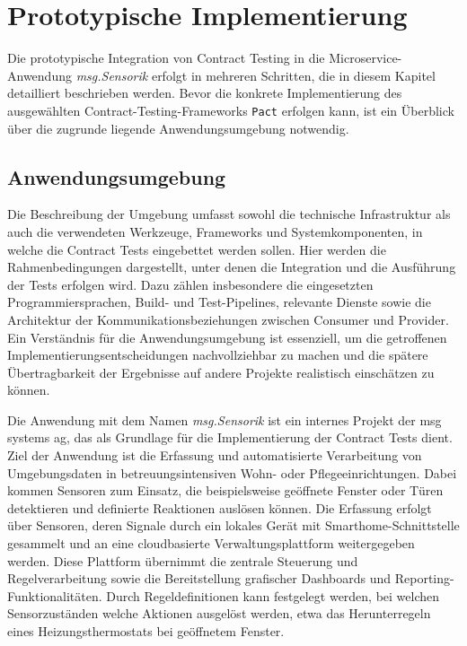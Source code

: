 \chapter{Prototypische Implementierung}\label{ch:implementation}

Die prototypische Integration von Contract Testing in die Microservice-Anwendung \textit{msg.Sensorik} erfolgt in mehreren Schritten, die in diesem Kapitel detailliert beschrieben werden.
Bevor die konkrete Implementierung des ausgewählten Contract-Testing-Frameworks \texttt{Pact} erfolgen kann, ist ein Überblick über die zugrunde liegende Anwendungsumgebung notwendig.

\section{Anwendungsumgebung}\label{sec:implementation_environment}

Die Beschreibung der Umgebung umfasst sowohl die technische Infrastruktur als auch die verwendeten Werkzeuge, Frameworks und Systemkomponenten, in welche die Contract Tests eingebettet werden sollen.
Hier werden die Rahmenbedingungen dargestellt, unter denen die Integration und die Ausführung der Tests erfolgen wird.
Dazu zählen insbesondere die eingesetzten Programmiersprachen, \gls{Build}- und Test-\glspl{Pipeline}, relevante Dienste sowie die Architektur der Kommunikationsbeziehungen zwischen Consumer und Provider.
Ein Verständnis für die Anwendungsumgebung ist essenziell, um die getroffenen Implementierungsentscheidungen nachvollziehbar zu machen und die spätere Übertragbarkeit der Ergebnisse auf andere Projekte realistisch einschätzen zu können.

Die Anwendung mit dem Namen \textit{msg.Sensorik} ist ein internes Projekt der msg systems ag, das als Grundlage für die Implementierung der Contract Tests dient.
Ziel der Anwendung ist die Erfassung und automatisierte Verarbeitung von Umgebungsdaten in betreuungsintensiven Wohn- oder Pflegeeinrichtungen.
Dabei kommen Sensoren zum Einsatz, die beispielsweise geöffnete Fenster oder Türen detektieren und definierte Reaktionen auslösen können.
Die Erfassung erfolgt über Sensoren, deren Signale durch ein lokales Gerät mit Smarthome-Schnittstelle gesammelt und an eine cloudbasierte Verwaltungsplattform weitergegeben werden.
Diese Plattform übernimmt die zentrale Steuerung und Regelverarbeitung sowie die Bereitstellung grafischer Dashboards und Reporting-Funktionalitäten.
Durch Regeldefinitionen kann festgelegt werden, bei welchen Sensorzuständen welche Aktionen ausgelöst werden, etwa das Herunterregeln eines Heizungsthermostats bei geöffnetem Fenster.

